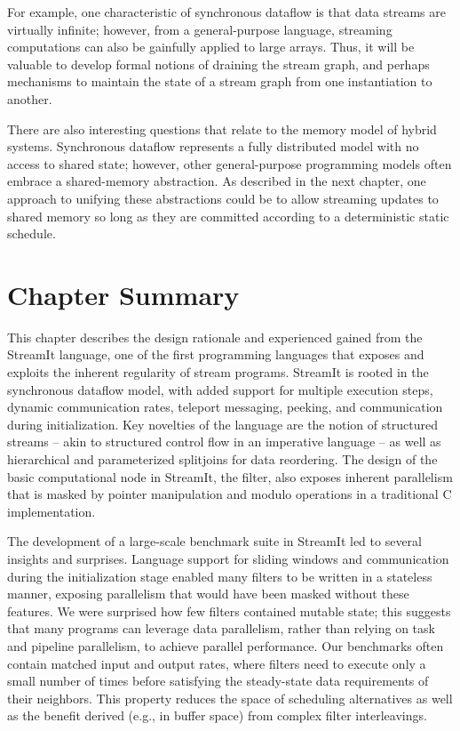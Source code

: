   For example, one characteristic of synchronous dataflow is that data
  streams are virtually infinite; however, from a general-purpose
  language, streaming computations can also be gainfully applied to
  large arrays.  Thus, it will be valuable to develop formal notions
  of draining the stream graph, and perhaps mechanisms to maintain the
  state of a stream graph from one instantiation to another.

  There are also interesting questions that relate to the memory model
  of hybrid systems.  Synchronous dataflow represents a fully
  distributed model with no access to shared state; however, other
  general-purpose programming models often embrace a shared-memory
  abstraction.  As described in the next chapter, one approach to
  unifying these abstractions could be to allow streaming updates to
  shared memory so long as they are committed according to a
  deterministic static schedule.

\myend

\section{Chapter Summary}

This chapter describes the design rationale and experienced gained
from the StreamIt language, one of the first programming languages
that exposes and exploits the inherent regularity of stream programs.
StreamIt is rooted in the synchronous dataflow model, with added
support for multiple execution steps, dynamic communication rates,
teleport messaging, peeking, and communication during initialization.
Key novelties of the language are the notion of structured streams --
akin to structured control flow in an imperative language -- as well
as hierarchical and parameterized splitjoins for data reordering.  The
design of the basic computational node in StreamIt, the filter, also
exposes inherent parallelism that is masked by pointer manipulation
and modulo operations in a traditional C implementation.

The development of a large-scale benchmark suite in StreamIt led to
several insights and surprises.  Language support for sliding windows
and communication during the initialization stage enabled many filters
to be written in a stateless manner, exposing parallelism that would
have been masked without these features.  We were surprised how few
filters contained mutable state; this suggests that many programs can
leverage data parallelism, rather than relying on task and pipeline
parallelism, to achieve parallel performance.  Our benchmarks often
contain matched input and output rates, where filters need to execute
only a small number of times before satisfying the steady-state data
requirements of their neighbors.  This property reduces the space of
scheduling alternatives as well as the benefit derived (e.g., in
buffer space) from complex filter interleavings.


